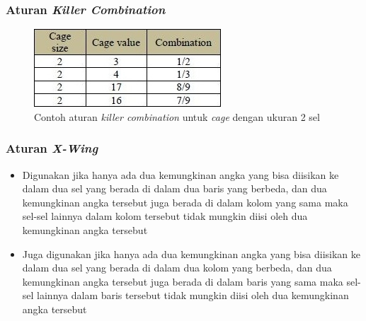 \documentclass{beamer}
\begin{document}
\begin{frame}
\frametitle{Aturan \textit{Killer Combination}}
\begin{figure}
\centering
\captionsetup{justification=centering}
\includegraphics[scale=1]{Gambar/HybridGenetic5}
\caption[Contoh aturan  \textit{killer combination} untuk \textit{cage} dengan ukuran 2 sel]{Contoh aturan  \textit{killer combination} untuk \textit{cage} dengan ukuran 2 sel}
\label{fig:hybrid5}
\end{figure}
\end{frame}

\note{

}

\begin{frame}
\frametitle{Aturan \textit{X-Wing}}
\begin{itemize}
\item Digunakan jika hanya ada dua kemungkinan angka yang bisa diisikan ke dalam dua sel yang berada di dalam dua baris yang berbeda, dan dua kemungkinan angka tersebut juga berada di dalam kolom yang sama maka sel-sel lainnya dalam kolom tersebut tidak mungkin diisi oleh dua kemungkinan angka tersebut
\item Juga digunakan jika hanya ada dua kemungkinan angka yang bisa diisikan ke dalam dua sel yang berada di dalam dua kolom yang berbeda, dan dua kemungkinan angka tersebut juga berada di dalam baris yang sama maka sel-sel lainnya dalam baris tersebut tidak mungkin diisi oleh dua kemungkinan angka tersebut
\end{itemize}
\end{frame}

\end{document}
